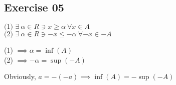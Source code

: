 \subsection*{Exercise 05}
\begin{flushleft}
$\text{(1) } \exists\ \alpha \in R \ni  x \geq  \alpha \ \forall  x \in  A$ \\
$\text{(2) } \exists\ \alpha \in R \ni -x \leq -\alpha \ \forall -x \in -A$ \\
\end{flushleft}

\begin{flushleft}
(1) $\implies  \alpha = \inf( A)$ \\
(2) $\implies -\alpha = \sup(-A)$
\end{flushleft}

\begin{flushleft}
Obviously, $a = -(-a) \implies \inf(A) = -\sup(-A)$
\end{flushleft}
